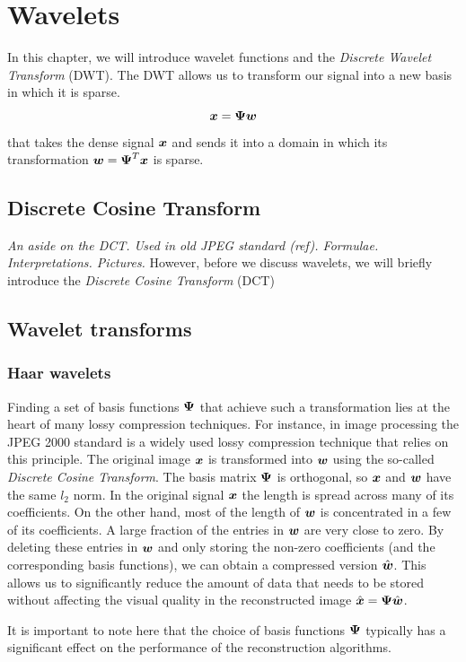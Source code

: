 \chapter{Wavelets}
In this chapter, we will introduce wavelet functions and the \emph{Discrete Wavelet Transform} (DWT).
The DWT allows us to transform our signal into a new basis in which it is sparse.
\begin{equation}
\boldsymbol x = \boldsymbol \Psi \boldsymbol w
\end{equation}
that takes the dense signal $\boldsymbol x$ and sends it into a domain in which its transformation $\boldsymbol w = \boldsymbol \Psi^T \boldsymbol x$ is sparse.

\section{Discrete Cosine Transform}
\emph{An aside on the DCT. Used in old JPEG standard (ref). Formulae. Interpretations. Pictures.}
However, before we discuss wavelets, we will briefly introduce the \emph{Discrete Cosine Transform} (DCT)

\section{Wavelet transforms}
\subsection{Haar wavelets}
Finding a set of basis functions $\boldsymbol\Psi$ that achieve such a transformation lies at the heart of many lossy compression techniques.
For instance, in image processing the JPEG 2000 standard is a widely used lossy compression technique that relies on this principle.
The original image $\boldsymbol x$ is transformed into $\boldsymbol w$ using the so-called \emph{Discrete Cosine Transform}.
The basis matrix $\boldsymbol \Psi$ is orthogonal, so $\boldsymbol x$ and $\boldsymbol w$ have the same $l_2$ norm.
In the original signal $\boldsymbol x$ the length is spread across many of its coefficients.
On the other hand, most of the length of $\boldsymbol w$ is concentrated in a few of its coefficients.
A large fraction of the entries in $\boldsymbol w$ are very close to zero. 
By deleting these entries in $\boldsymbol w$ and only storing the non-zero coefficients (and the corresponding basis functions), we can obtain a compressed version $\hat{\boldsymbol w}$. 
This allows us to significantly reduce the amount of data that needs to be stored without affecting the visual quality in the reconstructed image $\hat{\boldsymbol x} = \boldsymbol\Psi\hat{\boldsymbol w}$.

It is important to note here that the choice of basis functions $\boldsymbol \Psi$ typically has a significant effect on the performance of the reconstruction algorithms.

